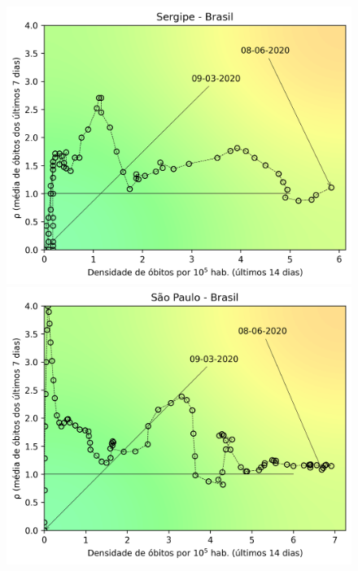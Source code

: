 \documentclass[]{article}
\begin{document}
\begin{figure}[!h]
	\centering
	\begin{minipage}[t]{4cm}
		\centering
		\includegraphics[scale=0.5]{../SE.png}
	\end{minipage}
	\hspace{5cm}
	\begin{minipage}[t]{4cm}
		\centering
		\includegraphics[scale=0.5]{../SP.png}
		\vspace{0.2cm}
	\end{minipage}
	

\end{figure}
\end{document}
